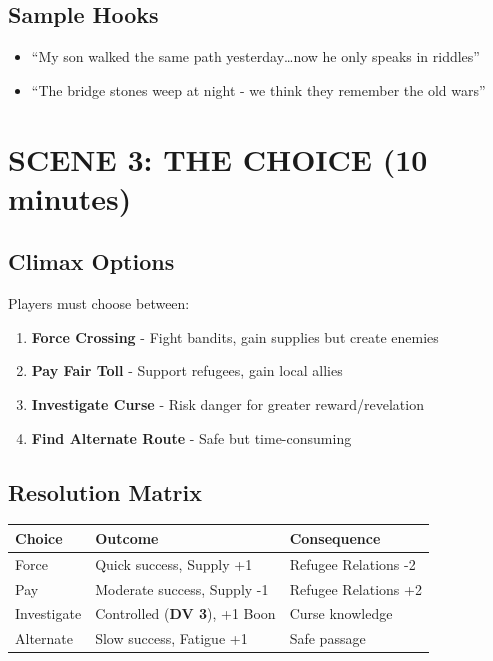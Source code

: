 \documentclass[12pt]{article}
\newcommand{\dv}[1]{\textbf{DV #1}}
\begin{document}
\subsection*{Sample Hooks}
\begin{itemize}
\item ``My son walked the same path yesterday\dots now he only speaks in riddles''
\item ``The bridge stones weep at night - we think they remember the old wars''
\end{itemize}

\section{SCENE 3: THE CHOICE (10 minutes)}

\subsection*{Climax Options}
Players must choose between:
\begin{enumerate}
\item \textbf{Force Crossing} - Fight bandits, gain supplies but create enemies
\item \textbf{Pay Fair Toll} - Support refugees, gain local allies  
\item \textbf{Investigate Curse} - Risk danger for greater reward/revelation
\item \textbf{Find Alternate Route} - Safe but time-consuming
\end{enumerate}

\subsection*{Resolution Matrix}
\begin{center}
\begin{tabularx}{\textwidth}{|l|l|l|}
\hline
\textbf{Choice} & \textbf{Outcome} & \textbf{Consequence} \\
\hline
Force & Quick success, Supply +1 & Refugee Relations -2 \\
\hline
Pay & Moderate success, Supply -1 & Refugee Relations +2 \\
\hline
Investigate & Controlled (\dv{3}), +1 Boon & Curse knowledge \\
\hline
Alternate & Slow success, Fatigue +1 & Safe passage \\
\hline
\end{tabularx}
\end{center}
\end{document}

